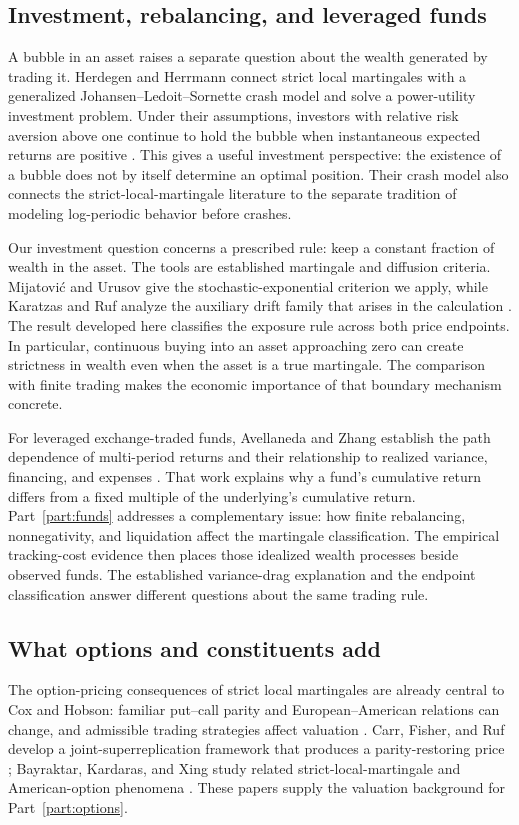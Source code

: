 \subsection{Investment, rebalancing, and leveraged funds}
A bubble in an asset raises a separate question about the wealth generated
by trading it. Herdegen and Herrmann connect strict local martingales with
a generalized Johansen--Ledoit--Sornette crash model and solve a power-utility
investment problem. Under their assumptions, investors with relative risk
aversion above one continue to hold the bubble when instantaneous expected
returns are positive \cite{herdegen2013strict}. This gives a useful
investment perspective: the existence of a bubble does not by itself
determine an optimal position. Their crash model also connects the
strict-local-martingale literature to the separate tradition of modeling
log-periodic behavior before crashes.

Our investment question concerns a prescribed rule: keep a constant fraction
of wealth in the asset. The tools are established martingale and diffusion
criteria. Mijatovi\'c and Urusov give the stochastic-exponential criterion
we apply, while Karatzas and Ruf analyze the auxiliary drift family that
arises in the calculation \cite{mijatovic2010martingale,karatzas2015distribution}.
The result developed here classifies the exposure rule across both price
endpoints. In particular, continuous buying into an asset approaching zero
can create strictness in wealth even when the asset is a true martingale.
The comparison with finite trading makes the economic importance of that
boundary mechanism concrete.

For leveraged exchange-traded funds, Avellaneda and Zhang establish the
path dependence of multi-period returns and their relationship to realized
variance, financing, and expenses \cite{avellaneda2009path}. That work
explains why a fund's cumulative return differs from a fixed multiple of
the underlying's cumulative return. Part~\ref{part:funds} addresses a
complementary issue: how finite rebalancing, nonnegativity, and liquidation
affect the martingale classification. The empirical tracking-cost evidence
then places those idealized wealth processes beside observed funds. The
established variance-drag explanation and the endpoint classification
answer different questions about the same trading rule.

\subsection{What options and constituents add}
The option-pricing consequences of strict local martingales are already
central to Cox and Hobson: familiar put--call parity and European--American
relations can change, and admissible trading strategies affect valuation
\cite{cox2005local}. Carr, Fisher, and Ruf develop a joint-superreplication
framework that produces a parity-restoring price \cite{carr2012hedging};
Bayraktar, Kardaras, and Xing study related strict-local-martingale and
American-option phenomena \cite{bayraktar2011strict}. These papers supply
the valuation background for Part~\ref{part:options}.

